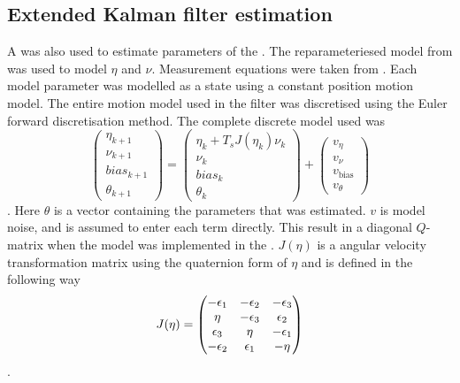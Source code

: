\subsection{Extended Kalman filter estimation}
A \abbrEKF was also used to estimate parameters of the \abbrROV. The reparameteriesed model from  was used to model $\eta$ and $\nu$. Measurement equations were taken from . Each model parameter was modelled as a state using a constant position motion model. The entire motion model used in the filter was discretised using the Euler forward discretisation method. The complete discrete model used was
\begin{equation}
\label{eq:motionModelKalman}
\begin{pmatrix}
\eta_{k+1}\\ 
\nu_{k+1}\\
bias_{k+1}\\
\theta_{k+1}
\end{pmatrix} = 
\begin{pmatrix}
\eta_k + T_s J(\eta_k)\nu_k\\
\nu_k\\
bias_k\\
\theta_k
\end{pmatrix}
+ \begin{pmatrix}
v_{\eta}\\
v_{\nu}\\
v_{\textrm{bias}}\\
v_{\theta}
\end{pmatrix}
\end{equation}.
Here $\theta$ is a vector containing the parameters that was estimated. $v$ is model noise, and is assumed to enter each term directly. This result in a diagonal $Q$-matrix when the model was implemented in the \abbrEKF. $J(\eta)$ is a angular velocity transformation matrix using the quaternion form of $\eta$ and is defined in the following way
\begin{equation}
J(\eta) = \begin{pmatrix}
-\epsilon_1  & -\epsilon_2  & -\epsilon_3 \\
\eta   & -\epsilon_3 & \epsilon_2   \\
\epsilon_3 & \eta    & -\epsilon_1   \\ 
-\epsilon_2 & \epsilon_1    & -\eta   \\ 
\end{pmatrix}
\end{equation}.

